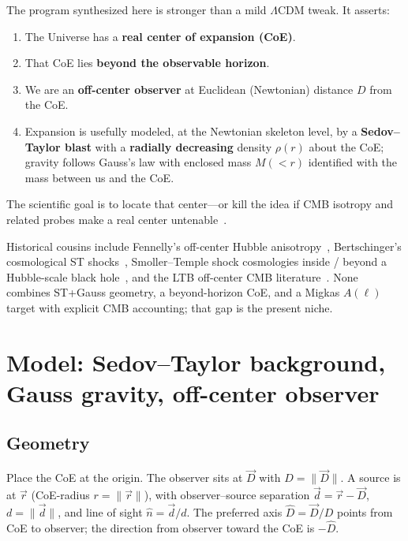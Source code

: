 \documentclass[11pt,a4paper]{article}
\begin{document}
The program synthesized here is stronger than a mild $\Lambda$CDM tweak. It
asserts:
\begin{enumerate}[leftmargin=*,itemsep=2pt]
\item The Universe has a \textbf{real center of expansion (CoE)}.
\item That CoE lies \textbf{beyond the observable horizon}.
\item We are an \textbf{off-center observer} at Euclidean (Newtonian) distance
  $D$ from the CoE.
\item Expansion is usefully modeled, at the Newtonian skeleton level, by a
  \textbf{Sedov--Taylor blast} with a \textbf{radially decreasing} density
  $\rho(r)$ about the CoE; gravity follows Gauss's law with enclosed mass
  $M(<r)$ identified with the mass between us and the CoE.
\end{enumerate}
The scientific goal is to locate that center---or kill the idea if CMB isotropy
and related probes make a real center untenable~\citep{Alnes2006,Kodama2010,Saadeh2016,Planck2018VII}.

Historical cousins include Fennelly's off-center Hubble anisotropy~\citep{Fennelly1977},
Bertschinger's cosmological ST shocks~\citep{Bertschinger1983}, Smoller--Temple
shock cosmologies inside / beyond a Hubble-scale black hole~\citep{SmollerTemple1998,SmollerTemple2002},
and the LTB off-center CMB literature~\citep{Alnes2006,Kodama2010,Blomqvist2010}.
None combines ST+Gauss geometry, a beyond-horizon CoE, and a Migkas $A(\ell)$
target with explicit CMB accounting; that gap is the present niche.

\section{Model: Sedov--Taylor background, Gauss gravity, off-center observer}
\label{sec:model}

\subsection{Geometry}
\label{sec:geom}

Place the CoE at the origin. The observer sits at $\vec{D}$ with $D=\|\vec{D}\|$.
A source is at $\vec{r}$ (CoE-radius $r=\|\vec{r}\|$), with observer--source
separation $\vec{d}=\vec{r}-\vec{D}$, $d=\|\vec{d}\|$, and line of sight
$\hat{n}=\vec{d}/d$. The preferred axis $\hat{D}=\vec{D}/D$ points from CoE to
observer; the direction from observer toward the CoE is $-\hat{D}$.
\end{document}
